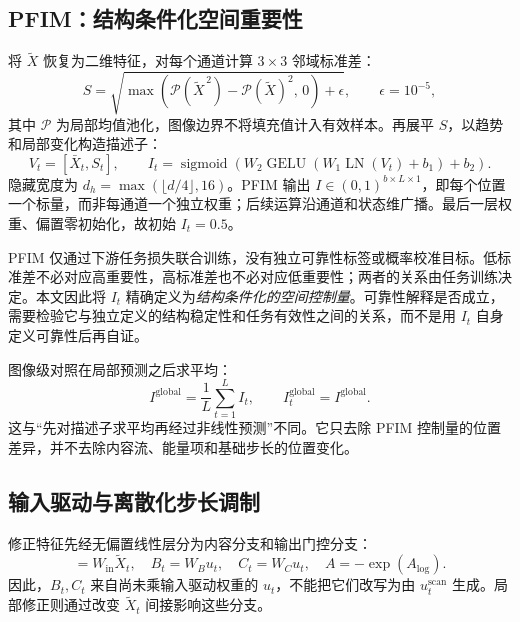 \documentclass[UTF8,11pt,a4paper,fontset=fandol]{ctexart}
\newcommand{\LN}{\operatorname{LN}}
\newcommand{\sigmoid}{\operatorname{sigmoid}}
\newcommand{\GELU}{\operatorname{GELU}}
\begin{document}
\subsection{PFIM：结构条件化空间重要性}
将 $\widetilde X$ 恢复为二维特征，对每个通道计算 $3\times3$ 邻域标准差：
\begin{equation}
S=\sqrt{\max\!\left(\mathcal P(\widetilde X^{\,2})-
                    \mathcal P(\widetilde X)^{2},\,0\right)+\epsilon},
\qquad \epsilon=10^{-5},
\label{eq:std}
\end{equation}
其中 $\mathcal P$ 为局部均值池化，图像边界不将填充值计入有效样本。再展平 $S$，以趋势和局部变化构造描述子：
\begin{equation}
V_t=[\bar X_t,S_t],\qquad
I_t=\sigmoid\!\left(W_2\GELU(W_1\LN(V_t)+b_1)+b_2\right).
\label{eq:pfim}
\end{equation}
隐藏宽度为 $d_h=\max(\lfloor d/4\rfloor,16)$。PFIM 输出 $I\in(0,1)^{b\times L\times1}$，即每个位置一个标量，而非每通道一个独立权重；后续运算沿通道和状态维广播。最后一层权重、偏置零初始化，故初始 $I_t=0.5$。

PFIM 仅通过下游任务损失联合训练，没有独立可靠性标签或概率校准目标。低标准差不必对应高重要性，高标准差也不必对应低重要性；两者的关系由任务训练决定。本文因此将 $I_t$ 精确定义为\emph{结构条件化的空间控制量}。可靠性解释是否成立，需要检验它与独立定义的结构稳定性和任务有效性之间的关系，而不是用 $I_t$ 自身定义可靠性后再自证。

图像级对照在局部预测之后求平均：
\begin{equation}
I^{\mathrm{global}}=\frac{1}{L}\sum_{t=1}^{L}I_t,\qquad
I^{\mathrm{global}}_t=I^{\mathrm{global}}.
\label{eq:global}
\end{equation}
这与“先对描述子求平均再经过非线性预测”不同。它只去除 PFIM 控制量的位置差异，并不去除内容流、能量项和基础步长的位置变化。

\subsection{输入驱动与离散化步长调制}\label{sec:modulation}
修正特征先经无偏置线性层分为内容分支和输出门控分支：
\begin{equation}
[u_t,z_t]=W_{\mathrm{in}}\widetilde X_t,\quad
B_t=W_Bu_t,\quad C_t=W_Cu_t,\quad A=-\exp(A_{\log}).
\label{eq:projection}
\end{equation}
因此，$B_t,C_t$ 来自尚未乘输入驱动权重的 $u_t$，不能把它们改写为由 $u^{\mathrm{scan}}_t$ 生成。局部修正则通过改变 $\widetilde X_t$ 间接影响这些分支。
\end{document}
